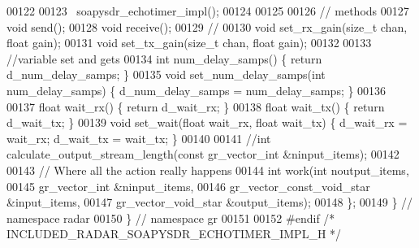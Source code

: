 \begin{DoxyCode}
00122 
00123         ~soapysdr_echotimer_impl();
00124 
00125 
00126         \textcolor{comment}{// methods}
00127         \textcolor{keywordtype}{void} send();
00128         \textcolor{keywordtype}{void} receive();
00129         \textcolor{comment}{//}
00130         \textcolor{keywordtype}{void} set_rx_gain(\textcolor{keywordtype}{size\_t} chan, \textcolor{keywordtype}{float} gain);
00131         \textcolor{keywordtype}{void} set_tx_gain(\textcolor{keywordtype}{size\_t} chan, \textcolor{keywordtype}{float} gain);
00132 
00133         \textcolor{comment}{//variable set and gets}
00134         \textcolor{keywordtype}{int} num_delay_samps() \{ \textcolor{keywordflow}{return} d_num_delay_samps; \}
00135         \textcolor{keywordtype}{void} set_num_delay_samps(\textcolor{keywordtype}{int} num_delay_samps) \{ d\_num\_delay\_samps = 
      num_delay_samps; \}
00136 
00137         \textcolor{keywordtype}{float} wait_rx() \{ \textcolor{keywordflow}{return} d_wait_rx; \}
00138         \textcolor{keywordtype}{float} wait_tx() \{ \textcolor{keywordflow}{return} d_wait_tx; \}
00139         \textcolor{keywordtype}{void} set_wait(\textcolor{keywordtype}{float} wait_rx, \textcolor{keywordtype}{float} wait_tx) \{ d\_wait\_rx = wait_rx; d\_wait\_tx = 
      wait_tx; \}
00140 
00141         \textcolor{comment}{//int calculate\_output\_stream\_length(const gr\_vector\_int &ninput\_items);}
00142 
00143         \textcolor{comment}{// Where all the action really happens}
00144         \textcolor{keywordtype}{int} work(\textcolor{keywordtype}{int} noutput\_items,
00145           gr\_vector\_int &ninput\_items,
00146           gr\_vector\_const\_void\_star &input\_items,
00147           gr\_vector\_void\_star &output\_items);
00148         \};
00149       \} \textcolor{comment}{// namespace radar}
00150     \} \textcolor{comment}{// namespace gr}
00151 
00152 \textcolor{preprocessor}{    #endif }\textcolor{comment}{/* INCLUDED\_RADAR\_SOAPYSDR\_ECHOTIMER\_IMPL\_H */}\textcolor{preprocessor}{}
\end{DoxyCode}
